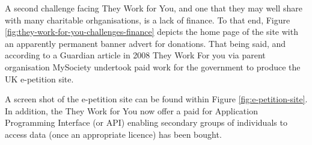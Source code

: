 A second challenge facing They Work for You, and one that they may well share with many charitable orhganisations, is a lack of finance.
To that end, Figure \ref{fig:they-work-for-you-challenges-finance} depicts the home page of the site with an apparently permanent banner advert for donations.
That being said, and according to a Guardian article in 2008 \cite{guardian-tom-steinberg} They Work For you via parent organisation MySociety undertook paid work for the government to produce the UK e-petition site.

A screen shot of the e-petition site can be found within Figure \ref{fig:e-petition-site}.
In addition, the They Work for You now offer a paid for Application Programming Interface (or API) enabling secondary groups of individuals to access data (once an appropriate licence) has been bought.